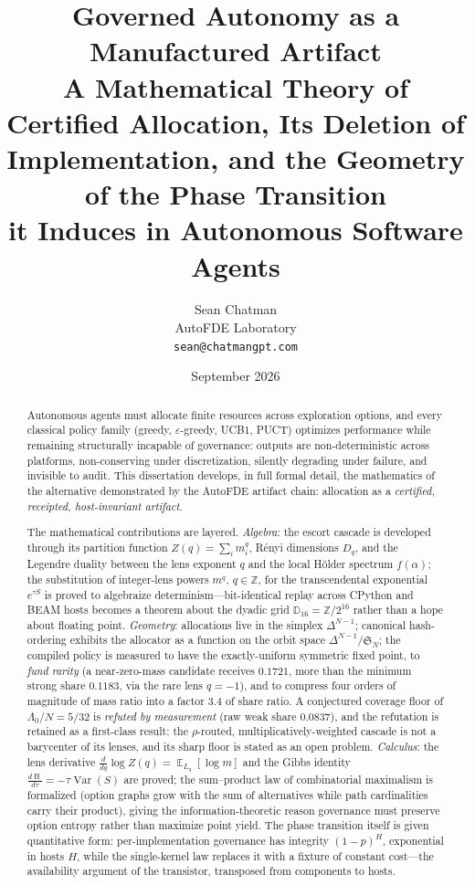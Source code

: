 \documentclass[12pt,oneside]{report}
\title{\textbf{Governed Autonomy as a Manufactured Artifact}\\[6pt]
\large A Mathematical Theory of Certified Allocation, Its Deletion of\\
\large Implementation, and the Geometry of the Phase Transition\\
\large it Induces in Autonomous Software Agents}
\author{Sean Chatman\\
\small AutoFDE Laboratory\\
\small \texttt{sean@chatmangpt.com}}
\date{September 2026}
\theoremstyle{plain}
\theoremstyle{definition}
\theoremstyle{remark}
\newcommand{\Z}{\mathbb{Z}}
\newcommand{\dyad}{\mathbb{D}}
\newcommand{\simplex}{\Delta}
\newcommand{\sym}{\mathfrak{S}}
\newcommand{\E}{\operatorname*{\mathbb{E}}}
\newcommand{\Var}{\operatorname{Var}}
\newcommand{\Ent}{\operatorname{H}}
\newcommand{\escort}[1]{L_{#1}}
\begin{document}
\maketitle

\begin{abstract}
\noindent
Autonomous agents must allocate finite resources across exploration
options, and every classical policy family (greedy, $\varepsilon$-greedy,
UCB1, PUCT) optimizes performance while remaining structurally incapable
of governance: outputs are non-deterministic across platforms,
non-conserving under discretization, silently degrading under failure,
and invisible to audit. This dissertation develops, in full formal
detail, the mathematics of the alternative demonstrated by the AutoFDE
artifact chain: allocation as a \emph{certified, receipted, host-invariant
artifact}.

The mathematical contributions are layered. \emph{Algebra}: the escort
cascade is developed through its partition function $Z(q)=\sum_i m_i^q$,
R\'enyi dimensions $D_q$, and the Legendre duality between the lens
exponent $q$ and the local H\"older spectrum $f(\alpha)$; the
substitution of integer-lens powers $m^q$, $q\in\Z$, for the
transcendental exponential $e^{\tau S}$ is proved to algebraize
determinism---bit-identical replay across CPython and BEAM hosts becomes
a theorem about the dyadic grid $\dyad_{16}=\Z/2^{16}$ rather than a
hope about floating point. \emph{Geometry}: allocations live in the
simplex $\simplex^{N-1}$; canonical hash-ordering exhibits the allocator
as a function on the orbit space $\simplex^{N-1}/\sym_N$; the compiled
policy is measured to have the exactly-uniform symmetric fixed point, to
\emph{fund rarity} (a near-zero-mass candidate receives $0.1721$, more
than the minimum strong share $0.1183$, via the rare lens $q=-1$), and
to compress four orders of magnitude of mass ratio into a factor
$3.4$ of share ratio. A conjectured coverage floor of
$\Lambda_0/N = 5/32$ is \emph{refuted by measurement} (raw weak share
$0.0837$), and the refutation is retained as a first-class result: the
$\rho$-routed, multiplicatively-weighted cascade is not a barycenter of
its lenses, and its sharp floor is stated as an open problem.
\emph{Calculus}: the lens derivative $\frac{d}{dq}\log
Z(q)=\E_{\escort{q}}[\log m]$ and the Gibbs identity
$\frac{d\Ent}{d\tau}=-\tau\Var(S)$ are proved; the sum--product law of
combinatorial maximalism is formalized (option graphs grow with the sum
of alternatives while path cardinalities carry their product), giving
the information-theoretic reason governance must preserve option
entropy rather than maximize point yield. The phase transition itself
is given quantitative form: per-implementation governance has integrity
$(1-p)^H$, exponential in hosts $H$, while the single-kernel law
replaces it with a fixture of constant cost---the availability
argument of the transistor, transposed from components to hosts.


\end{abstract}
\end{document}
